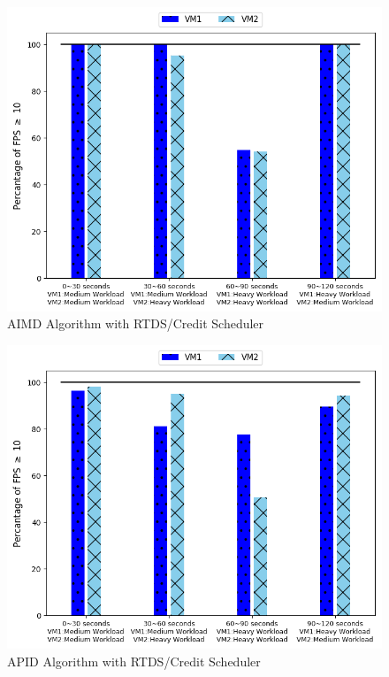 \begin{itemize}
\begin{figure}[h!]
\centering
\includegraphics[width=1\linewidth]{images/2vm_fps_aimd}
\caption{AIMD Algorithm with RTDS/Credit Scheduler}
\label{2vm_fps_aimd}
\end{figure}

\begin{figure}[h!]
\centering
\includegraphics[width=1\linewidth]{images/2vm_fps_apid}
\caption{APID Algorithm with RTDS/Credit Scheduler}
\label{2vm_fps_apid}
\end{figure}




\end{itemize}


